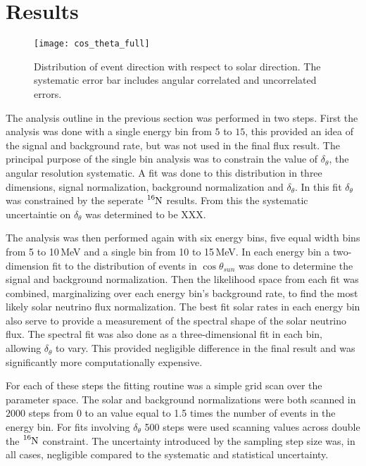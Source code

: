 \section{Results}
\begin{figure}
  \centering
  \texttt{[image: cos\_theta\_full]}
  \caption[5.0 to 15.0 MeV $\cos\theta_{sun}$ Distribution] {Distribution of event direction
                                              with respect to solar direction.
                                              The systematic error bar includes
                                              angular correlated and
                                              uncorrelated errors.}

  \label{fig:costheta}
\end{figure}
The analysis outline in the previous section was performed in two steps.
First the analysis was done with a single energy bin from $5$ to $15$,
this provided an idea of the signal and background rate, but was not used in
the final flux result.
The principal purpose of the single bin analysis was to constrain the value of
$\delta_{\theta}$, the angular resolution systematic.
A fit was done to this distribution in three dimensions, signal normalization,
background normalization and $\delta_{\theta}$.
In this fit $\delta_{\theta}$ was constrained by the seperate $\ce{^{16}N}$ 
results.
From this the systematic uncertaintie on $\delta_{\theta}$
was determined to be XXX.

The analysis was then performed again with six energy bins, five equal width
bins from 5 to 10\,MeV and a single bin from 10 to 15\,MeV.
In each energy bin a two-dimension fit to the distribution of events in $\cos\theta_{sun}$ was
done to determine the signal and background normalization.
Then the likelihood space from each fit was combined,
marginalizing over each energy bin's background rate,
to find the most likely solar neutrino flux normalization.
The best fit solar rates in each energy bin also serve to provide
a measurement of the spectral shape of the solar neutrino
flux.
The spectral fit was also done as a three-dimensional fit
in each bin, allowing $\delta_{\theta}$ to vary.
This provided negligible difference in the final result
and was significantly more computationally expensive.

For each of these steps the fitting routine was a simple grid scan
over the parameter space. 
The solar and background normalizations were both scanned in $2000$ steps from 0 to
an  value equal to  1.5 times the number of events in the energy bin.
For fits involving $\delta_{\theta}$ 500 steps were used scanning values across
double the $\ce{^{16}N}$ constraint.
The uncertainty introduced by the sampling step size was, in all cases, negligible
compared to the systematic and statistical uncertainty.

